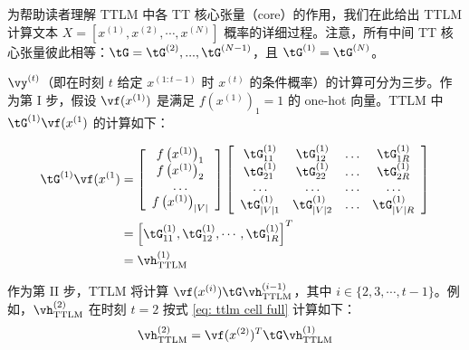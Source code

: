 \documentclass{article}
\theoremstyle{plain}
\theoremstyle{definition}
\theoremstyle{remark}
\begin{document}
为帮助读者理解 TTLM 中各 TT 核心张量（core）的作用，我们在此给出 TTLM 计算文本 $X = [x^{(1)}, x^{(2)}, \cdots ,x^{(N)}]$ 概率的详细过程。注意，所有中间 TT 核心张量彼此相等：$\tG = \tG^{(2)},...,\tG^{(N-1)}$，且 $\tG^{(1)} = \tG^{(N)}$。

$\vy^{(t)}$（即在时刻 $t$ 给定 $x^{(1:t-1)}$ 时 $x^{(t)}$ 的条件概率）的计算可分为三步。作为第 I 步，假设 $\vf(x^{(1)})$ 是满足 $f(x^{(1)})_1 = 1$ 的 one-hot 向量。TTLM 中 $\tG^{(1)}\vf(x^{(1})$ 的计算如下：

\begin{align}
\tG^{(1)}\vf(x^{(1}) &=
\left[\begin{array}{c}
f\left(x^{(1)}\right)_1 \\
f\left(x^{(1)}\right)_2 \\
\ldots \\
f\left(x^{(1)}\right)_{|V|}
\end{array}\right] \left[\begin{array}{cccc}
\tG_{11}^{(1)} & \tG_{12}^{(1)} & \ldots & \tG_{1 R}^{(1)} \\
\tG_{21}^{(1)} & \tG_{22}^{(1)} & \ldots & \tG_{2 R}^{(1)} \\
\ldots & \ldots & \ldots & \ldots \\
\tG_{|V| 1}^{(1)} & \tG_{|V| 2}^{(1)} & \ldots & \tG_{|V| R}^{(1)}
\end{array}\right] \nonumber \\
&=\left[\tG_{11}^{(1)}, \tG_{12}^{(1)}, \cdots, \tG_{1R}^{(1)}\right]^T \nonumber \\
&=\vh_{\textrm{TTLM}}^{(1)} \nonumber
\end{align}


作为第 II 步，TTLM 将计算
$\vf(x^{(i)})\tG\vh^{(i-1)}_{\textrm{TTLM}}$，其中 $i \in \{2,3,\cdots,t-1\}$。例如，$\vh_{\textrm{TTLM}}^{(2)}$ 在时刻 $t= 2$ 按式 \ref{eq: ttlm cell full} 计算如下：
\begin{align}
    \vh_{\textrm{TTLM}}^{(2)} = \vf(x^{(2)})^T\tG  \vh^{(1)}_{\textrm{TTLM}} \nonumber
\end{align}
\end{document}
